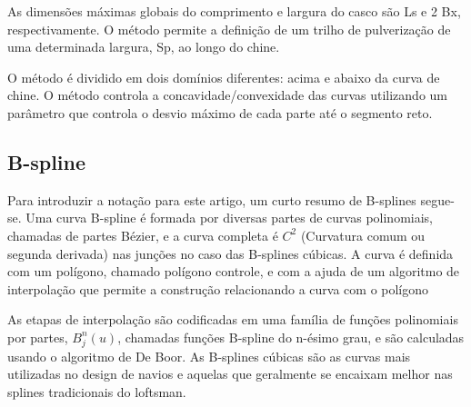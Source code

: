 \documentclass[]{article}
\begin{document}
As dimensões máximas globais do comprimento e largura do casco são Ls e 2 Bx, respectivamente. O método permite a definição de um trilho de pulverização de uma determinada largura, Sp, ao longo do chine.

O método é dividido em dois domínios diferentes: acima e abaixo da curva de chine. O método controla a concavidade/convexidade das curvas utilizando um parâmetro que controla o desvio máximo de cada parte até o segmento reto.

\subsection{B-spline}

Para introduzir a notação para este artigo, um curto resumo de B-splines segue-se. Uma curva B-spline é formada por diversas partes de curvas polinomiais, chamadas de partes Bézier, e a curva completa é $C^2$ (Curvatura comum ou segunda derivada) nas junções no caso das B-splines cúbicas. A curva é definida com um polígono, chamado polígono controle, e com a ajuda de um algoritmo de interpolação que permite a construção relacionando a curva com o polígono 

As etapas de interpolação são codificadas em uma família de funções polinomiais por partes, $B_j^n(u)$, chamadas funções B-spline do n-ésimo grau, e são calculadas usando o algoritmo de De Boor. As B-splines cúbicas são as curvas mais utilizadas no design de navios e aquelas que geralmente se encaixam melhor nas splines tradicionais do loftsman.
\end{document}
